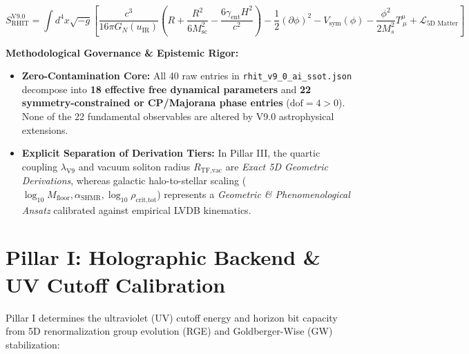 \documentclass[11pt, a4paper]{article}
\begin{document}
\begin{equation}
S_{\text{RHIT}}^{\text{V9.0}} = \int d^4x \sqrt{-g} \left[ \frac{c^3}{16\pi G_N(u_{\text{IR}})} \left( R + \frac{R^2}{6 M_{\text{sc}}^2} - \frac{6\gamma_{\text{ent}} H^2}{c^2} \right) - \frac{1}{2}(\partial\phi)^2 - V_{\text{sym}}(\phi) - \frac{\phi^2}{2M_s^2} T^\mu_{\ \mu} + \mathcal{L}_{5\text{D Matter}} \right]
\end{equation}

\noindent\textbf{Methodological Governance \& Epistemic Rigor:}
\begin{itemize}
    \item \textbf{Zero-Contamination Core:} All 40 raw entries in \texttt{rhit\_v9\_0\_ai\_ssot.json} decompose into \textbf{18 effective free dynamical parameters} and \textbf{22 symmetry-constrained or CP/Majorana phase entries} ($\text{dof} = 4 > 0$). None of the 22 fundamental observables are altered by V9.0 astrophysical extensions.
    \item \textbf{Explicit Separation of Derivation Tiers:} In Pillar III, the quartic coupling $\lambda_{\text{V9}}$ and vacuum soliton radius $R_{\text{TF,vac}}$ are \emph{Exact 5D Geometric Derivations}, whereas galactic halo-to-stellar scaling ($\log_{10} M_{\text{floor}}, \alpha_{\text{SHMR}}, \log_{10} \rho_{\text{crit,tot}}$) represents a \emph{Geometric \& Phenomenological Ansatz} calibrated against empirical LVDB kinematics.
\end{itemize}

\section{Pillar I: Holographic Backend \& UV Cutoff Calibration}

Pillar I determines the ultraviolet (UV) cutoff energy and horizon bit capacity from 5D renormalization group evolution (RGE) and Goldberger-Wise (GW) stabilization:
\end{document}
